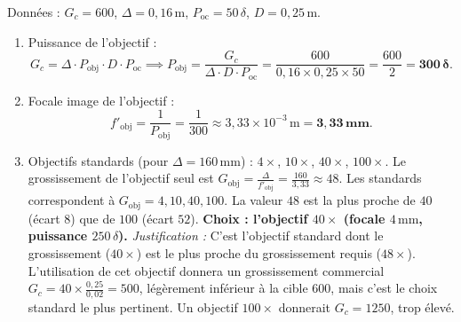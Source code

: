 \documentclass[11pt]{article}
\begin{document}
\begin{corrige}
Données : $G_c = 600$, $\Delta = 0,16\,\text{m}$, $P_{\text{oc}} = 50\,\delta$, $D = 0,25\,\text{m}$.

\begin{enumerate}
    \item Puissance de l'objectif :
    \[
    G_c = \Delta \cdot P_{\text{obj}} \cdot D \cdot P_{\text{oc}} \implies P_{\text{obj}} = \frac{G_c}{\Delta \cdot D \cdot P_{\text{oc}}} = \frac{600}{0,16 \times 0,25 \times 50} = \frac{600}{2} = \mathbf{300\,\delta}.
    \]
    \item Focale image de l'objectif :
    \[
    f'_{\text{obj}} = \frac{1}{P_{\text{obj}}} = \frac{1}{300} \approx 3,33\times10^{-3}\,\text{m} = \mathbf{3,33\,\text{mm}}.
    \]
    \item Objectifs standards (pour $\Delta = 160\,\text{mm}$) : $4\times$, $10\times$, $40\times$, $100\times$.
    Le grossissement de l'objectif seul est $G_{\text{obj}} = \frac{\Delta}{f'_{\text{obj}}} = \frac{160}{3,33} \approx 48$.
    Les standards correspondent à $G_{\text{obj}} = 4, 10, 40, 100$.
    La valeur $48$ est la plus proche de $40$ (écart $8$) que de $100$ (écart $52$).
    \textbf{Choix : l'objectif $40\times$ (focale $4\,\text{mm}$, puissance $250\,\delta$).}
    \emph{Justification :} C'est l'objectif standard dont le grossissement ($40\times$) est le plus proche du grossissement requis ($48\times$). L'utilisation de cet objectif donnera un grossissement commercial $G_c = 40 \times \frac{0,25}{0,02} = 500$, légèrement inférieur à la cible $600$, mais c'est le choix standard le plus pertinent. Un objectif $100\times$ donnerait $G_c = 1250$, trop élevé.
\end{enumerate}
\end{corrige}
\end{document}
